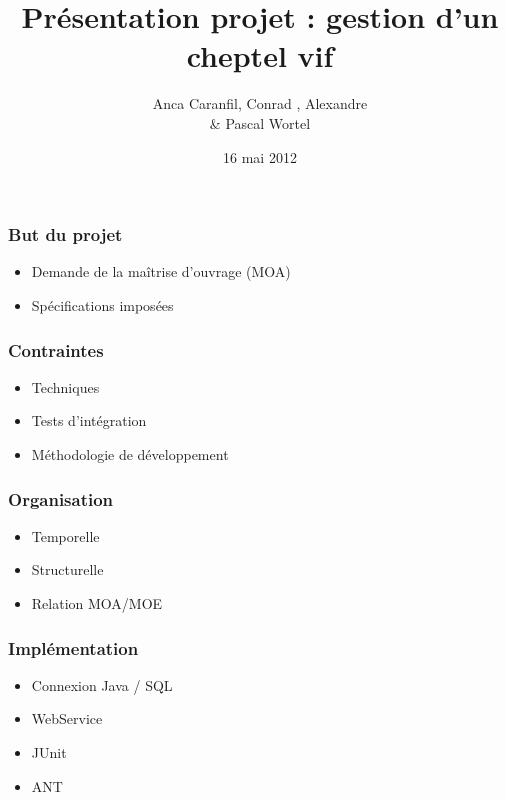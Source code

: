 \documentclass[handout]{beamer}
\title[Saint-Venant]{Présentation projet : gestion d'un cheptel vif}
\author{Anca Caranfil, Conrad \bsc{Hillairet}, Alexandre \bsc{Vieira} \\ \& Pascal Wortel}
\institute{INSA de Rouen}
\date{16 mai 2012}
\begin{document}
\begin{frame}
\titlepage
\end{frame}

\begin{frame}
	\frametitle{But du projet}
	\begin{itemize}
		\item Demande de la maîtrise d'ouvrage (MOA)
		\item Spécifications imposées
	\end{itemize}	
\end{frame}

\begin{frame}
	\frametitle{Contraintes}
	\begin{itemize}
		\item Techniques
		\item Tests d'intégration
		\item Méthodologie de développement
	\end{itemize}
\end{frame}

\begin{frame}
	\frametitle{Organisation}
	\begin{itemize}
		\item Temporelle
		\item Structurelle
		\item Relation MOA/MOE
	\end{itemize}
\end{frame}

\begin{frame}
	\frametitle{Implémentation}
	\begin{itemize}
		\item Connexion Java / SQL
		\item WebService
		\item JUnit
		\item ANT
	\end{itemize}
\end{frame}
\end{document}
